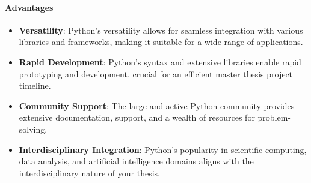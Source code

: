         \paragraph{Advantages}
        \begin{itemize}
            \item \textbf{Versatility}: Python's versatility allows for seamless integration with various libraries and frameworks, making it suitable for a wide range of applications.
            \item \textbf{Rapid Development}: Python's syntax and extensive libraries enable rapid prototyping and development, crucial for an efficient master thesis project timeline.
            \item \textbf{Community Support}: The large and active Python community provides extensive documentation, support, and a wealth of resources for problem-solving.
            \item \textbf{Interdisciplinary Integration}: Python's popularity in scientific computing, data analysis, and artificial intelligence domains aligns with the interdisciplinary nature of your thesis.
        \end{itemize}
        
